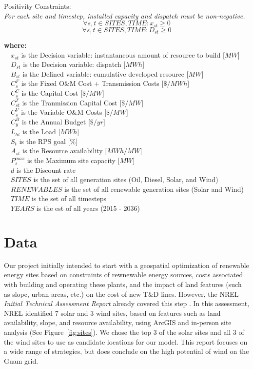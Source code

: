 \documentclass[12pt,letterpaper,fleqn]{article}
\begin{document}
  Positivity Constraints:\\
  \emph{For each site and timestep, installed capacity and dispatch
    must be non-negative.}
  \[\forall s,t \in SITES, TIME: x_{st} \ge 0\]
  \[\forall s,t \in SITES, TIME: D_{st} \ge 0\]
  
  \textbf{where:}\\
  {\setlength{\parindent}{-1em}
    $\quad x_{st}^{}$ is the Decision variable: instantaneous amount of resource to build [$MW$]\\
    $\quad D_{st}^{}$ is the Decision variable: dispatch [$MWh$]\\
    $\quad B_{st}^{}$ is the Defined variable: cumulative developed resource [$MW$]\\
    $\quad C_{s}^{F}$ is the Fixed O\&M Cost + Transmission Costs [$\$/MWh$]\\
    $\quad C_{s}^{C}$ is the Capital Cost [$\$/MW$]\\
    $\quad C_{st}^{T}$ is the Tranmission Capital Cost [$\$/MW$]\\
    $\quad C_{s}^{V}$ is the Variable O\&M Costs [$\$/MW$]\\
    $\quad C_{y}^{B}$ is the Annual Budget [$\$/yr$]\\
    $\quad L_{ht}^{}$ is the Load [$MWh$]\\
    $\quad S_{t}^{}$ is the RPS goal [$\%$]\\
    $\quad A_{st}^{}$ is the Resource availability [$MWh/MW$]\\
    $\quad P_{s}^{max}$ is the Maximum site capacity [$MW$]\\
    $\quad d$ is the Discount rate\\
    $\quad SITES$ is the set of all generation sites (Oil, Diesel,
    Solar, and Wind)\\
    $\quad RENEWABLES$ is the set of all renewable generation sites
    (Solar and Wind)\\
    $\quad TIME$ is the set of all timesteps\\
    $\quad YEARS$ is the est of all years (2015 - 2036)
  }


\section{Data}

Our project initially intended to start with a geospatial optimization
of renewable energy sites based on constraints of rewnewable energy
sources, costs associated with building and operating these plants,
and the impact of land features (such as slope, urban areas, etc.) on
the cost of new T\&D lines. However, the NREL \emph{Initial Technical
  Assessment Report} already covered this step \cite{misty}. In this
assessment, NREL identified 7 solar and 3 wind sites, based on
features such as land availability, slope, and resource availability,
using ArcGIS and in-person site analysis (See
Figure~\ref{fig:sites}). We chose the top 3 of the solar sites and all
3 of the wind sites to use as candidate locations for our model. This
report focuses on a wide range of strategies, but does conclude on the
high potential of wind on the Guam grid.
\end{document}
